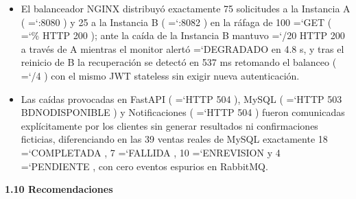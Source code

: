 \documentclass[11pt,a4paper]{article}
\renewcommand{\_}{\oldunderscore\allowbreak}
\DeclareRobustCommand{\texttt}[1]{%
  {\upshape\ttfamily\fontsize{9}{10.8}\selectfont\hyphenchar\font=`\-\relax #1}%
}
\begin{document}
\begin{itemize}[leftmargin=*,itemsep=3pt,topsep=2pt]
  \item El balanceador NGINX distribuyó exactamente 75 solicitudes a la Instancia A (\texttt{:8080}) y 25 a la Instancia B (\texttt{:8082}) en la ráfaga de 100 \texttt{GET} (\texttt{100\% HTTP 200}); ante la caída de la Instancia B mantuvo \texttt{20/\allowbreak{}20 HTTP 200} a través de A mientras el monitor alertó \texttt{DEGRADADO} en 4.8 s, y tras el reinicio de B la recuperación se detectó en 537 ms retomando el balanceo (\texttt{16/4}) con el mismo JWT stateless sin exigir nueva autenticación.
  \item Las caídas provocadas en FastAPI (\texttt{HTTP 504}), MySQL (\texttt{HTTP 503 BD\_NO\_DISPONIBLE}) y Notificaciones (\texttt{HTTP 504}) fueron comunicadas explícitamente por los clientes sin generar resultados ni confirmaciones ficticias, diferenciando en las 39 ventas reales de MySQL exactamente 18 \texttt{COMPLETADA}, 7 \texttt{FALLIDA}, 10 \texttt{EN\_REVISION} y 4 \texttt{PENDIENTE}, con cero eventos espurios en RabbitMQ.
\end{itemize}

\vspace{0.2cm}

\noindent\textbf{1.10 Recomendaciones}
\end{document}
